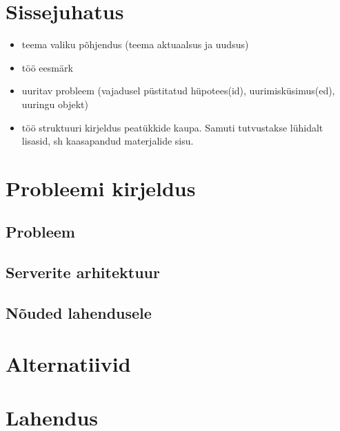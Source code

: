 \documentclass[12pt]{report}
\begin{document}
  \tableofcontents
 
  \newpage
  
  \section*{Sissejuhatus}
  \label{sissejuhatus}
  
  \begin{itemize}
    \item teema valiku põhjendus (teema aktuaalsus ja uudsus)
    \item töö eesmärk
    \item  uuritav probleem (vajadusel püstitatud hüpotees(id), uurimisküsimus(ed), uuringu objekt)
    \item töö struktuuri kirjeldus peatükkide kaupa. Samuti tutvustakse lühidalt lisasid, sh kaasapandud
materjalide sisu.
  \end{itemize}
  
  \newpage
  
  \section{Probleemi kirjeldus}
  
  \subsection{Probleem}
  
  \subsection{Serverite arhitektuur}
  
  \subsection{Nõuded lahendusele}
  
  \newpage
  
  \section{Alternatiivid}
  
  \newpage
  
  \section{Lahendus}
  
\end{document}
